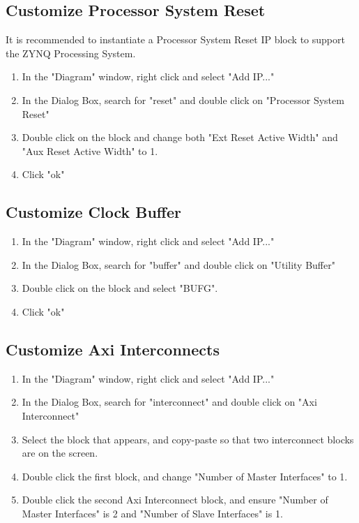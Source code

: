 \documentclass[12pt]{article}
\begin{document}
\subsection{Customize Processor System Reset} It is recommended to instantiate a Processor System Reset IP block to support the ZYNQ Processing System. 
\begin{enumerate}
\item In the "Diagram" window, right click and select "Add IP..."
\item In the Dialog Box, search for "reset" and double click on "Processor System Reset"
\item Double click on the block and change both "Ext Reset Active Width" and "Aux Reset Active Width" to 1.
\item Click "ok"
\end{enumerate}

\subsection{Customize Clock Buffer}
\begin{enumerate}
\item In the "Diagram" window, right click and select "Add IP..."
\item In the Dialog Box, search for "buffer" and double click on "Utility Buffer"
\item Double click on the block and select "BUFG".
\item Click "ok"
\end{enumerate}

\subsection{Customize Axi Interconnects}
\begin{enumerate}
\item In the "Diagram" window, right click and select "Add IP..."
\item In the Dialog Box, search for "interconnect" and double click on "Axi Interconnect"
\item Select the block that appears, and copy-paste so that two interconnect blocks are on the screen.
\item Double click the first block, and change "Number of Master Interfaces" to 1.
\item Double click the second Axi Interconnect block, and ensure "Number of Master Interfaces" is 2 and "Number of Slave Interfaces" is 1.
\end{enumerate}
\end{document}
